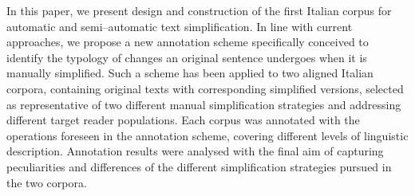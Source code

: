 In this paper, we present design and construction of the first Italian corpus for automatic and semi--automatic text simplification. In line with current approaches, we propose a new annotation scheme specifically conceived to identify the typology of changes an original sentence undergoes when it is manually simplified. Such a scheme has been applied to two aligned Italian corpora, containing original texts with corresponding simplified versions, selected as representative of two different manual simplification strategies and addressing different target reader populations. Each corpus was annotated with the operations foreseen in the annotation scheme, covering different levels of linguistic description. Annotation results were analysed with the final aim of capturing peculiarities and differences of the different simplification strategies pursued in the two corpora.
